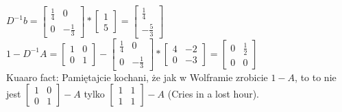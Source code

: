 \documentclass{article}
\begin{document}
$D^{-1}b=\begin{bmatrix} \frac{1}{4} & 0 \\ 0 & -\frac{1}{3} \end{bmatrix}*\begin{bmatrix} 1 \\ 5 \end{bmatrix} = \begin{bmatrix} \frac{1}{4} \\ -\frac{5}{3} \end{bmatrix}$\\
$1-D^{-1}A = \begin{bmatrix} 1 & 0 \\ 0 & 1 \end{bmatrix}-\begin{bmatrix} \frac{1}{4} & 0 \\ 0 & -\frac{1}{3} \end{bmatrix}*\begin{bmatrix} 4 & -2 \\ 0 & -3 \end{bmatrix} = \begin{bmatrix} 0 & \frac{1}{2} \\ 0 & 0 \end{bmatrix}$\\

Kuaaro fact: Pamiętajcie kochani, że jak w Wolframie zrobicie $1-A$, to to nie jest $\begin{bmatrix} 1 & 0 \\ 0 & 1 \end{bmatrix} - A$ tylko $\begin{bmatrix} 1 & 1 \\ 1 & 1 \end{bmatrix} - A$ (Cries in a lost hour).
\end{document}
